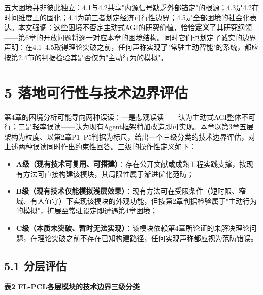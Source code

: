 \documentclass[11pt,a4paper]{ctexart}
\begin{document}
五大困境并非彼此独立：4.1与4.2共享"内源信号缺乏外部锚定"的根源；4.3是4.2在时间维度上的固化；4.4为前三者划定经济可行性边界；4.5是全部困境的社会化表达。本文强调：这些困境不否定主动式AGI的研究价值，恰恰\textbf{定义}了其研究纲领——第6章的开放问题将逐一对应本章的困境结构。同时它们也划定了诚实的边界声明：在4.1--4.5取得理论突破之前，任何声称实现了"常驻主动智能"的系统，都应按第2.4节的判据检验其是否仅为"主动行为的模拟"。

\section{5 落地可行性与技术边界评估}

第4章的困境分析可能导向两种误读：一是悲观误读——认为主动式AGI整体不可行；二是轻率误读——认为现有Agent框架稍加改造即可实现。本章以第3章五层架构为粒度、以第2章P1--P5判据为标尺，给出一个三级分类的技术边界评估，对上述两种误读同时作出约束性回答。三级的操作性定义如下：

\begin{itemize}

  \item \textbf{A级（现有技术可复用、可搭建）}：存在公开文献或成熟工程实践支撑，按现有方法可直接构建该模块，其局限性属于渐进优化范畴；

  \item \textbf{B级（现有技术仅能模拟浅层效果）}：现有方法可在受限条件（短时限、窄域、有人值守）下实现该模块的外观功能，但按第2章判据检验属于"主动行为的模拟"，扩展至常驻设定即遭遇第4章困境；

  \item \textbf{C级（本质未突破、暂时无法实现）}：该模块依赖第4章所论证的未解决理论问题，在理论突破之前不存在已知构建路径，任何实现声称都应视为范畴错误。

\end{itemize}

\subsection{5.1 分层评估}

\textbf{表2 FL-PCL各层模块的技术边界三级分类}
\end{document}
